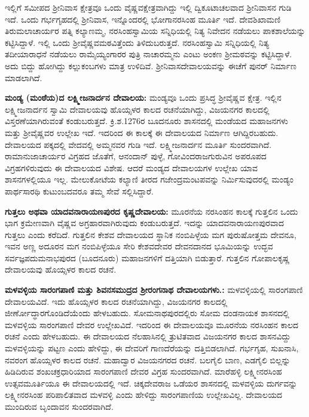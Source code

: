ಇಲ್ಲಿಗೆ ಸಮೀಪದ ಶ‍್ರೀನಿವಾಸ ಕ್ಷೇತ್ರವೂ ಒಂದು ವೈಷ್ಣವಕ್ಷೇತ್ರವಾಗಿದ್ದು ಇಲ್ಲಿ ದ್ವಿಕೂಟಾಚಲವಾದ ಶ‍್ರೀನಿವಾಸನ ಗುಡಿ ಇದೆ. ಒಂದು ಗರ್ಭಗೃಹದಲ್ಲಿ ಶ‍್ರೀನಿವಾಸ, ಇನ್ನೊಂದರಲ್ಲಿ ಭೋಗಾನರಸಿಂಹ ಮೂರ್ತಿ ಇದೆ. ದೇವಶಿಖಾಮಣಿ ತಿರುಮಲಾಚಾರ್ಯರ ಪತ್ನಿ ಕಲ್ಯಾಣಮ್ಮ, ನರಸಿಂಹಸ್ವಾಮಿಯ ಸನ್ನಿಧಿಯಲ್ಲಿ ನಿತ್ಯ ನಿವೇದನ ನಡೆಯಲು ಪಾಕಶಾಲೆಯನ್ನು ಕಟ್ಟಿಸಿದ್ದಾಳೆ. ಇಲ್ಲಿ ಒಂದು ಶ‍್ರೀವೈಷ್ಣವಮಠವಿತ್ತೆಂದು ತಿಳಿದುಬರುತ್ತದೆ. ನರಸಿಂಹಸ್ವಾಮಿ ಸನ್ನಿಧಿಯಲ್ಲಿ ನಿತ್ಯ ತದೀಯಾರಾಧನೆ ನಡೆಯಲು ರಾಮೈಯ್ಯಂಗಾರರ ಪುತ್ರಿ ನಾಚಾರಮ್ಮನು ಎಂಟು ಅಂಕಣ ಶ‍್ರೀಮಠವನ್ನು ಕಟ್ಟಿಸಿದ್ದಾಳೆ. ಅದು ಬಿದ್ದು ಹೋಗಿದ್ದು ಕಲ್ಲುಕಂಬಗಳು ಮಾತ್ರ ಉಳಿದಿವೆ. ಶ‍್ರೀನಿವಾಸದೇವಾಲಯವನ್ನು ಈಚೆಗೆ ಪುನರ್​ ನಿರ್ಮಾಣ ಮಾಡಲಾಗಿದೆ.

\textbf{ಮಂಡ್ಯ (ಮಂಠೆಯ)ದ ಲಕ್ಷ್ಮೀಜನಾರ್ದನ ದೇವಾಲಯ:} ಮಂಡ್ಯವೂ ಒಂದು ಪ್ರಸಿದ್ಧ ಶ‍್ರೀವೈಷ್ಣವ ಕ್ಷೇತ್ರ. ಇಲ್ಲಿನ ಲಕ್ಷ್ಮೀಜನಾರ್ದನ ಸ್ವಾಮಿ ದೇವಾಲಯವು ಹೊಯ್ಸಳರ ಕಾಲದ ರಚನೆಯಾಗಿದ್ದು, ವಿಜಯನಗರ ಕಾಲದಲ್ಲಿ ವಿಸ್ತರಣೆಯಾಗಿರುವಂತೆ ಕಂಡುಬರುತ್ತದೆ. ಕ್ರಿ.ಶ.1276ರ ಬೂದನೂರು ಶಾಸನದಲ್ಲಿ ಮಂಡೆಯದ ಮಹಾಜನಗಳು ಮತ್ತು ಶ‍್ರೀವೈಷ್ಣವರ ಉಲ್ಲೇಖ ಇದೆ. ಇದರಿಂದ ಈ ಕಾಲಕ್ಕೆ ಈ ದೇವಾಲಯದ ನಿರ್ಮಾಣ ಆಗಿದ್ದಿರಬಹುದು. ದೇವಾಲಯದ ಪಕ್ಕದಲ್ಲಿ ವೇದವಲ್ಲಿ ಅಮ್ಮನವರ ಗುಡಿ ಇದೆ. ಲಕ್ಷ್ಮೀಜನಾರ್ದನ ಮೂರ್ತಿ ಸುಂದರವಾಗಿದೆ. ರಾಮಾನುಜಾಚಾರ್ಯರ ವಿಗ್ರಹದ ಜೊತೆಗೆ, ಆನಂದಾನ್​ ಪುಳ್ಳೆ, ಗೋವಿಂದರಾಜಗುರುವಿನ ಅಪರೂಪದ ವಿಗ್ರಹಗಳಿರುವುದು ಈ ದೇವಾಲಯದ ವಿಶೇಷ. ಆದರೆ ಮಂಡ್ಯದ ದೇವಾಲಯಗಳ ಉಲ್ಲೇಖ ಯಾವ ಶಾಸನಗಳಲ್ಲಿಯೂ ಇಲ್ಲ. ಮೇಲುಕೋಟೆಯ ಕಲ್ಯಾಣಿ ತೀರದ ಗಜೇಂದ್ರಮಂಟಪವನ್ನು ನಿರ್ಮಿಸುವುದರಲ್ಲಿ ಮಂಡ್ಯಂ ಪಾರ್ಥಸಾರಥಿ ಕುಟುಂಬದವರೂ ತಮ್ಮ ಸೇವೆ ಸಲ್ಲಿಸಿದ್ದಾರೆ.

\textbf{ಗುತ್ತಲು ಅಥವಾ ಯಾದವನಾರಾಯಣಪುರದ ಕೃಷ್ಣದೇವಾಲಯ:} ಮೂರನೆಯ ನರಸಿಂಹನ ಕಾಲಕ್ಕೆ ಗುತ್ತಲಿನ ಒಂದು ಭಾಗ ಕ್ರಮೇಣವಾಗಿ ವೈಷ್ಣವ ಅಗ್ರಹಾರವಾಗಿರುವುದು ಕಂಡುಬರುತ್ತದೆ. ಇದನ್ನು ಯಾದವನಾರಾಯಣಪುರವಾದ ಗುತ್ತಲು ಎಂದು ಕರೆದಿದೆ. ಗುತ್ತಲಿನ ಕೇಶವ ದೇವಾಲಯದ ಸ್ಥಾನಿಕ ನಂಬಿಪಿಳ್ಳೆಯ ಮಗ ಪುರುಷೋತ್ತಮ ದೇವನೂ, ಇವನ ಅಣ್ಣ ಅದೂರನ ಮಗ ನಂಬಿಪಿಳ್ಳೆಯೂ ಸೇರಿ ಕೇಶವದೇವರ ದೇವನದಾನದ ಭೂಮಿಯನ್ನು ಉದ್ಭವ ಸರ್ವಜ್ಞಪದುಮನಾಭಪುರದ (ಬೂದನೂರು) ಮಹಾಜನಗಳಿಗೆ ದತ್ತಿಯಾಗಿ ಬಿಡುತ್ತಾರೆ. ಗುತ್ತಲಿನ ಗೋಪಾಲಕೃಷ್ಣ ದೇವಾಲಯವು ಹೊಯ್ಸಳರ ಕಾಲದ ರಚನೆ. 

\textbf{ಮಳವಳ್ಳಿಯ ಸಾರಂಗಪಾಣಿ ಮತ್ತು ಶಿವನಸಮುದ್ರದ ಶ‍್ರೀರಂಗನಾಥ ದೇವಾಲಯಗಳು.:} ಮಳವಳ್ಳಿಯಲ್ಲಿ ಸಾರಂಗಪಾಣಿ ದೇವಾಲಯವಿದೆ. ಇದು ಹೊಯ್ಸಳರ ಕಾಲದ ರಚನೆಯಾಗಿದ್ದು, ವಿಜಯನಗರ ಕಾಲದಲ್ಲಿ ಜೀರ್ಣೋದ್ಧಾರಗೊಂಡಿದೆಯೆಂದು ಹೇಳಬಹುದು. ಸೋಮನಾಥಪುರದಲ್ಲಿರು ಸೋಮ ದಂಡನಾಯಕ ಶಾಸನದಲ್ಲಿ ಮಳವಳ್ಳಿಯ ಸಾರಂಗಪಾಣಿ ದೇವರ ಉಲ್ಲೇಖವಿದೆ. ಇದರಿಂದ ಈ ದೇವಾಲಯವೂ ಮೂರನೆಯ ನರಸಿಂಹನ ಕಾಲದ ರಚನೆ ಎಂದು ಹೇಳಬಹುದು. ಈ ದೇವಾಲಯದ ನೆಲಹಾಸಿನಲ್ಲಿ ತ್ರುಟಿತವಾದ ವಿಜಯನಗರ ಕಾಲದ ಶಾಸನವಿದ್ದು ಮಳವಳ್ಳಿಯನ್ನು ಪಟ್ಟಣ ಎಂದು ಹೇಳಿದ್ದು, ಈ ದೇವರಿಗೆ ಗಾಣದೆರೆಯನ್ನು ದತ್ತಿಬಿಡಲಾಗಿದೆ. ಗರ್ಭಗೃಹ, ಸುಖನಾಸಿ, ನವರಂಗ ಹೊಯ್ಸಳರ ಕಾಲದ ರಚನೆ. ಮಹಾದ್ವಾರ ವಿಜಯನಗರದ ರಚನೆ. ಬಲಗೈಲಿ ಬಾಣ, ಎಡಗೈಲಿ ಬಿಲ್ಲನ್ನು ಹಿಡಿದಿರುವ ಶಂಖಚಕ್ರಧಾರಿಯಾದ ಸಾರಂಗಪಾಣಿ ದೇವರ ವಿಗ್ರಹ ಸುಂದರವಾಗಿದೆ. ಮಾರೆಹಳ್ಳಿ ಲಕ್ಷ್ಮೀನರಸಿಂಹ ಉತ್ಸವಮೂರ್ತಿಯೂ ಈ ದೇವಾಲಯದಲ್ಲಿ ಇದೆ. ಚಿಕ್ಕದೇವರಾಜ ಒಡೆಯರ ಶಾಸನದಲ್ಲಿ ಮಳವಳ್ಳಿಯ ದುರ್ಗವನ್ನು ಲಕ್ಷ್ಮೀನರಸಿಂಹ ಪರಿಪಾಲಿತವಾದ ಮಳವಳ್ಳಿ ಎಂದು ಹೇಳಿದ್ದು ಸಾರಂಗಪಾಣಿಯ ಉಲ್ಲೇಖವಿಲ್ಲ. ದೇವಾಲಯದ ಮುಂದಿರುವ ಬೃಂದಾವನ ಸುಂದರವಾಗಿದೆ.

